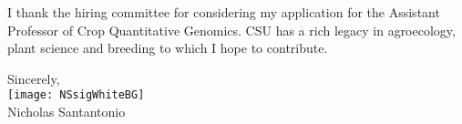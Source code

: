 \documentclass[11pt, letterpaper]{moderncv}
\begin{document}
I thank the hiring committee for considering my application for the Assistant Professor of Crop Quantitative Genomics. CSU has a rich legacy in agroecology, plant science and breeding to which I hope to contribute. 

\vspace{3mm}

Sincerely,\\
\texttt{[image: NSsigWhiteBG]}\\
Nicholas Santantonio
\end{document}
